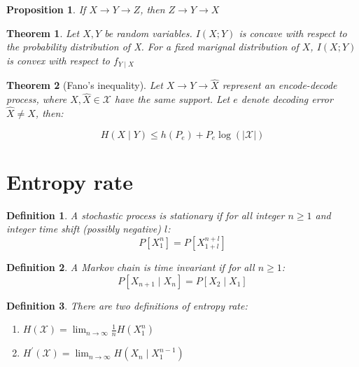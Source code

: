 \documentclass{article}
\newcommand{\norm}[1]{\vert {#1} \vert}
\newtheorem{definition}{Definition}[section]
\newtheorem{theorem}{Theorem}[section]
\newtheorem{proposition}{Proposition}[section]
\begin{document}
    \begin{proposition}
        If $X \rightarrow Y \rightarrow Z$, then $Z \rightarrow Y \rightarrow X$
    \end{proposition}

    \begin{theorem}
        Let $X, Y$ be random variables. $I(X; Y)$ is concave with respect to the probability distribution of X. For a fixed marignal distribution of $X$, $I(X; Y)$ is convex with respect to $f_{Y \mid X}$
    \end{theorem}

    \begin{theorem}[Fano's inequality]\label{fanos-inequality}
        Let $X \rightarrow Y \rightarrow \hat{X}$ represent an encode-decode process, where $X, \hat{X} \in \mathcal{X}$ have the same support. Let $e$ denote decoding error $\hat{X} \neq X$, then:

        $$
        H(X \mid Y) \leq h(P_e) + P_e \log(\norm{\mathcal{X}})
        $$
    \end{theorem}

\section{Entropy rate}
    \begin{definition}
        A stochastic process is stationary if for all integer $n \geq 1$ and integer time shift (possibly negative) $l$:
        \begin{equation*}
            P[X_1^n] = P[X_{1+l}^{n+l}]
        \end{equation*}
    \end{definition}

    \begin{definition}
        A Markov chain is time invariant if for all $n \geq 1$:
        \begin{equation*}
            P[X_{n+1} \mid X_n] = P[X_2 \mid X_1]
        \end{equation*}
    \end{definition}

    \begin{definition}
        There are two definitions of entropy rate:
        \begin{enumerate}
            \item $H(\mathcal{X}) = \lim_{n\rightarrow\infty}\frac{1}{n}H(X_1^n)$
            \item $H^\prime(\mathcal{X}) = \lim_{n\rightarrow\infty}H(X_n\mid X_1^{n-1})$
        \end{enumerate}
    \end{definition}
\end{document}
